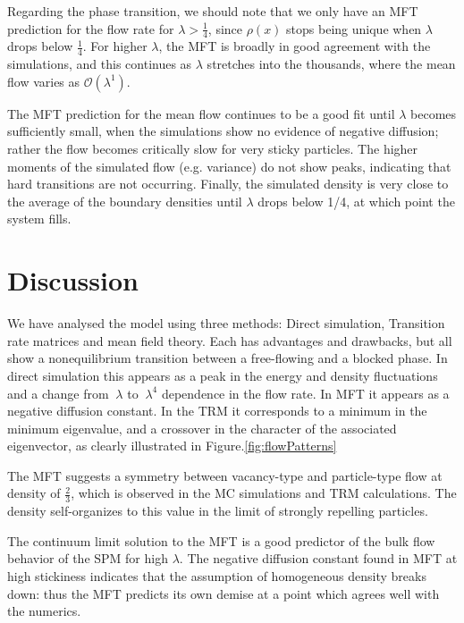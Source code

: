 \documentclass[
reprint, amsmath,amssymb, aps,
 prx,
]{revtex4-1}
\begin{document}
Regarding the phase transition, we should note that we only have an
MFT prediction for the flow rate for $\lambda>\frac{1}{4}$, since
$\rho(x)$ stops being unique when $\lambda$ drops below $\frac{1}{4}$. For higher $\lambda$, the MFT is broadly in good agreement with the
simulations, and this continues as $\lambda$ stretches into the
thousands, where the mean flow varies as $\mathcal{O}(\lambda^1)$.


The MFT prediction for the mean flow continues to be a good fit until $\lambda$ becomes sufficiently small,
when the simulations show no evidence of negative diffusion; rather the flow becomes critically slow for very sticky particles.
The higher moments of the simulated flow (e.g. variance) do not show peaks, indicating that hard transitions are not occurring.
Finally, the  simulated density is very close to the average of the boundary densities until $\lambda$ drops below 1/4, at which point the system fills.



\section{Discussion}

We have analysed the model using three methods: Direct simulation,
Transition rate matrices and mean field theory. Each has advantages
and drawbacks, but all show a nonequilibrium transition between a
free-flowing and a blocked phase.  In direct simulation this appears
as a peak in the energy and density fluctuations and a change from
$~\lambda$ to $~\lambda^4$ dependence in the flow rate.  In MFT it
appears as a negative diffusion constant.  In the TRM it corresponds
to a minimum in the minimum eigenvalue, and a crossover in the
character of the associated eigenvector, as clearly illustrated in
Figure.\ref{fig:flowPatterns}

The MFT suggests a symmetry between vacancy-type and particle-type
flow at density of $\frac{2}{3}$, which is observed in the MC
simulations and TRM calculations.  The density self-organizes to this
value in the limit of strongly repelling particles.

The continuum limit solution to
the MFT is a good predictor of the bulk flow behavior of the SPM for
high $\lambda$.  The negative diffusion constant found in MFT at high
stickiness indicates that the assumption of homogeneous density breaks
down: thus the MFT predicts its own demise at a point which agrees well with
the numerics.
\end{document}
